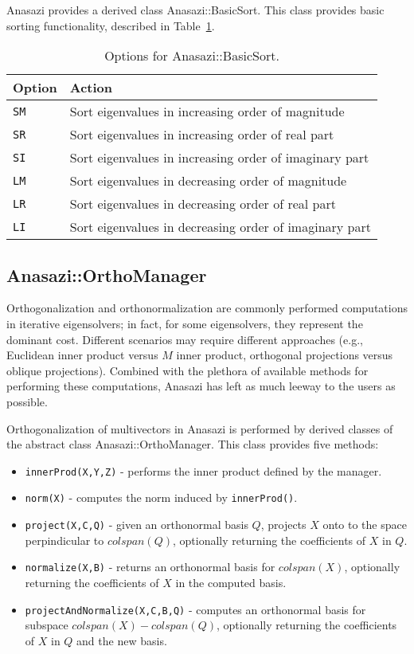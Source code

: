 Anasazi provides a derived class Anasazi::BasicSort.  This class provides basic sorting
functionality, described in Table~\ref{tab:anasazi:sm}.

\begin{table}
\begin{center}
\begin{tabular}{| p{2cm} l |}
\hline
Option & Action \\
\hline
{\tt SM} & Sort eigenvalues in increasing order of magnitude \\
{\tt SR} & Sort eigenvalues in increasing order of real part \\
{\tt SI} & Sort eigenvalues in increasing order of imaginary part \\
{\tt LM} & Sort eigenvalues in decreasing order of magnitude \\
{\tt LR} & Sort eigenvalues in decreasing order of real part \\
{\tt LI} & Sort eigenvalues in decreasing order of imaginary part \\
\hline
\end{tabular}
\caption{Options for Anasazi::BasicSort.}
\label{tab:anasazi:sm}
\end{center}
\end{table}


\subsection{Anasazi::OrthoManager}
\label{sec:anasazi:ortho}

Orthogonalization and orthonormalization are commonly performed computations in iterative
eigensolvers; in fact, for some eigensolvers, they represent the dominant cost.  Different
scenarios may require different approaches (e.g., Euclidean inner product versus $M$ inner
product, orthogonal projections versus oblique projections).  Combined with the plethora
of available methods for performing these computations, Anasazi has left as much leeway to
the users as possible.

Orthogonalization of multivectors in Anasazi is performed by derived classes of
the abstract class Anasazi::OrthoManager. This class provides five methods:
\begin{itemize}
  \item \verb!innerProd(X,Y,Z)! - performs the inner product defined by the manager.
  \item \verb!norm(X)! - computes the norm induced by \verb!innerProd()!.
  \item \verb!project(X,C,Q)! - given an orthonormal basis $Q$, projects $X$ onto to the space perpindicular to
    $colspan(Q)$, optionally returning the coefficients of $X$ in $Q$.
  \item \verb!normalize(X,B)! - returns an orthonormal basis for $colspan(X)$, optionally
    returning the coefficients of $X$ in the computed basis.
  \item \verb!projectAndNormalize(X,C,B,Q)! - computes an orthonormal basis for subspace
    \newline
    $colspan(X) - colspan(Q)$, optionally returning the coefficients of
    $X$ in $Q$ and the new basis.
\end{itemize}


